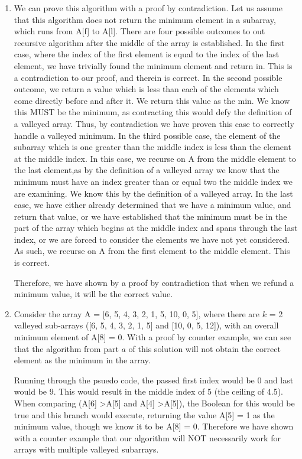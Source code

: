 \documentclass[12pt]{article}
\begin{document}
\begin{enumerate}
\begin{enumerate}
    \item
    
    We can prove this algorithm with a proof by contradiction. Let us assume that this algorithm does not return the minimum element in a subarray, which runs from A[f] to A[l]. There are four possible outcomes to out recursive algorithm after the middle of the array is established.
    In the first case, where the index of the first element is equal to the index of the last element, we have trivially found the minimum element and return in. This is a contradiction to our proof, and therein is correct.
    In the second possible outcome, we return a value which is less than each of the elements which come directly before and after it. We return this value as the min. We know this MUST be the minimum, as contracting this would defy the definition of a valleyed array. Thus, by contradiction we have proven this case to correctly handle a valleyed minimum.
    In the third possible case, the element of the subarray which is one greater than the middle index is less than the element at the middle index. In this case, we recurse on A from the middle element to the last element,as by the definition of a valleyed array we know that the minimum must have an index greater than or equal two the middle index we are examining. We know this by the definition of a valleyed array.
    In the last case, we have either already determined that we have a minimum value, and return that value, or we have established that the minimum must be in the part of the array which begins at the middle index and spans through the last index, or we are forced to consider the elements we have not yet considered. As such, we recurse on A from the first element to the middle element. This is correct. 
    
    Therefore, we have shown by a proof by contradiction that when we refund a minimum value, it will be the correct value.
    \item
    Consider the array A = [6, 5, 4, 3, 2, 1, 5, 10, 0, 5], where there are $k$ = 2 valleyed sub-arrays ([6, 5, 4, 3, 2, 1, 5] and [10, 0, 5, 12]), with an overall minimum element of A[8] = 0. With a proof by counter example, we can see that the algorithm from part $a$ of this solution will not obtain the correct element as the minimum in the array. 
    
    Running through the psuedo code, the passed first index would be 0 and last would be 9. This would result in the middle index of 5 (the ceiling of 4.5). When comparing (A[6] \textgreater A[5] and A[4] \textgreater A[5]), the Boolean for this would be true and this branch would execute, returning the value A[5] = 1 as the minimum value, though we know it to be A[8] = 0. Therefore we have shown with a counter example that our algorithm will NOT necessarily work for arrays with multiple valleyed subarrays.
    

\end{enumerate}
\end{enumerate}
\end{document}
